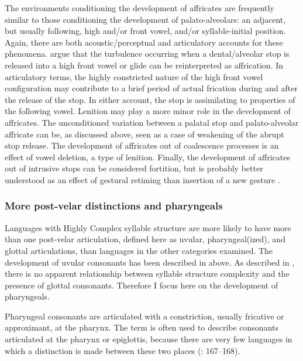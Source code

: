   The environments conditioning the development of affricates are frequently similar to those conditioning the development of palato-alveolars: an adjacent, but usually following, high and/or front vowel, and/or syllable-initial position. Again, there are both acoustic/perceptual and articulatory accounts for these phenomena. \citet{HallEtAl2006} argue that the turbulence occurring when a dental/alveolar stop is released into a high front vowel or glide can be reinterpreted as affrication. In articulatory terms, the highly constricted nature of the high front vowel configuration may contribute to a brief period of actual frication during and after the release of the stop. In either account, the stop is assimilating to properties of the following vowel. Lenition may play a more minor role in the development of affricates. The unconditioned variation between a palatal stop and palato-alveolar affricate can be, as discussed above, seen as a case of weakening of the abrupt stop release. The development of affricates out of coalescence processes is an effect of vowel deletion, a type of lenition. Finally, the development of affricates out of intrusive stops can be considered fortition, but is probably better understood as an effect of gestural retiming than insertion of a new gesture \citep[43--44]{Bybee2015b}.

\subsubsection{{More} {post-velar} {distinctions} {and} {pharyngeals}}\label{sec:4.5.2.5}

  Languages with Highly Complex syllable structure are more likely to have more than one post-velar articulation, defined here as uvular, pharyngeal(ized), and glottal articulations, than languages in the other categories examined. The development of uvular consonants has been described in  above. As described in , there is no apparent relationship between syllable structure complexity and the presence of glottal consonants. Therefore I focus here on the development of pharyngeals.

  Pharyngeal consonants are articulated with a constriction, usually fricative or approximant, at the pharynx. The term is often used to describe consonants articulated at the pharynx or epiglottis, because there are very few languages in which a distinction is made between these two places (\citealt{LadefogedMaddieson1996}: 167--168).

